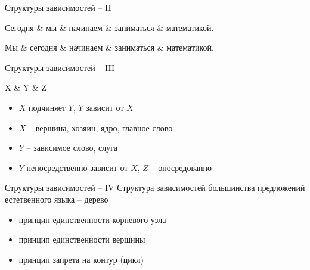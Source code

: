 \documentclass{beamer}
\begin{document}
\begin{frame}{Структуры зависимостей -- II}
\begin{dependency}[theme = simple]
   \begin{deptext}[column sep=1em]
      Сегодня \& мы \& начинаем \& заниматься \& математикой. \\
   \end{deptext}
\end{dependency}

\begin{dependency}[theme = simple]
   \begin{deptext}[column sep=1em]
      Мы \& сегодня \& начинаем \& заниматься \& математикой. \\
   \end{deptext}
\end{dependency}
\end{frame}

\begin{frame}{Структуры зависимостей -- III}
\begin{center}
\begin{dependency}[theme = simple]
   \begin{deptext}[column sep=1em]
      X \& Y \& Z \\
   \end{deptext}
\end{dependency}
\end{center}
\medskip
\begin{itemize}
    \item $X$ подчиняет $Y$, $Y$ зависит от $X$
    \item $X$ -- вершина, хозяин, ядро, главное слово
    \item $Y$ -- зависимое слово, слуга
    \item $Y$ непосредственно зависит от $X$, $Z$ -- опосредованно
\end{itemize}
\end{frame}

\begin{frame}{Структуры зависимостей -- IV}
Структура зависимостей большинства предложений естетвенного языка -- дерево\\
\medskip
\begin{itemize}
    \item принцип единственности корневого узла
    \item принцип единственности вершины
    \item принцип запрета на контур (цикл)
\end{itemize}
\end{frame}
\end{document}
